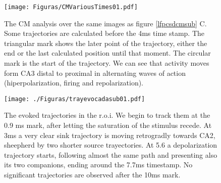 \documentclass[12pt, letterpaper]{article}
\begin{document}



\begin{figure}[h]
 \texttt{[image: Figuras/CMVariousTimes01.pdf]}
  \caption{ The CM analysis over the same images as figure \ref{lfpcsdcmsub} C. Some trajectories
    are calculated before the 4ms time stamp. The triangular mark shows the later point of the
    trajectory, either the end or the last calculated position until that moment. The circular
    mark is the start of the trajectory. We can see that activity moves form CA3 distal to
    proximal in alternating waves of action (hiperpolarization, firing and repolarization).
  }\label{cmevocada}
\end{figure} 



\begin{figure}[h]
  \texttt{[image: ./Figuras/trayevocadasub01.pdf]}
  \caption{The evoked trajectories in the r.o.i. We begin to track them
    at the 0.9 ms mark, after letting the saturation of the stimulus recede.
    At 3ms a very clear sink trajectory is moving retrogradly towards CA2,
    sheepherd by two shorter source trayectories. At 5.6 a depolarization
    trajectory starts, following almost the same path and presenting also its
    two companions, ending around the 7.7ms timestamp. No significant
  trajectories are observed after the 10ms mark. }\label{trayevo}
\end{figure}
\end{document}
